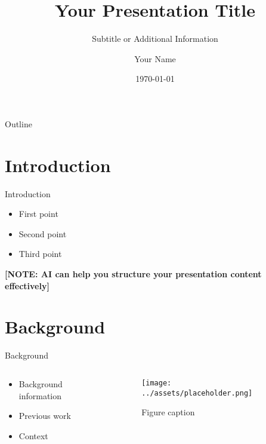 \documentclass[aspectratio=169]{beamer}
\title{Your Presentation Title}
\subtitle{Subtitle or Additional Information}
\author{Your Name}
\institute{Your Institution}
\date{\today}
\newcommand{\note}[1]{\textcolor{aiGreen}{\textbf{[NOTE: #1]}}}
\begin{document}
\begin{frame}
    \titlepage
\end{frame}

\begin{frame}{Outline}
    \tableofcontents
\end{frame}

\section{Introduction}
\begin{frame}{Introduction}
    \begin{itemize}
        \item<1-> First point
        \item<2-> Second point
        \item<3-> Third point
    \end{itemize}
    
    \note{AI can help you structure your presentation content effectively}
\end{frame}

\section{Background}
\begin{frame}{Background}
    \begin{columns}
        \begin{column}{0.6\textwidth}
            \begin{itemize}
                \item Background information
                \item Previous work
                \item Context
            \end{itemize}
        \end{column}
        \begin{column}{0.4\textwidth}
            \begin{figure}
                \centering
                \texttt{[image: ../assets/placeholder.png]}
                \caption{Figure caption}
            \end{figure}
        \end{column}
    \end{columns}
\end{frame}
\end{document}
